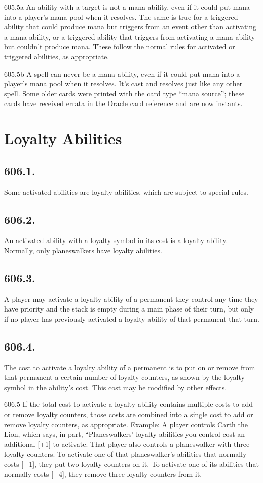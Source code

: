 605.5a An ability with a target is not a mana ability, even if it could put mana into a player’s mana pool when it resolves. The same is true for a triggered ability that could produce mana but triggers from an event other than activating a mana ability, or a triggered ability that triggers from activating a mana ability but couldn’t produce mana. These follow the normal rules for activated or triggered abilities, as appropriate.

605.5b A spell can never be a mana ability, even if it could put mana into a player’s mana pool when it resolves. It’s cast and resolves just like any other spell. Some older cards were printed with the card type “mana source”; these cards have received errata in the Oracle card reference and are now instants.

\section{Loyalty Abilities}
\subsection*{606.1.}
Some activated abilities are loyalty abilities, which are subject to special rules.

\subsection*{606.2.}
An activated ability with a loyalty symbol in its cost is a loyalty ability. Normally, only planeswalkers have loyalty abilities.

\subsection*{606.3.}
A player may activate a loyalty ability of a permanent they control any time they have priority and the stack is empty during a main phase of their turn, but only if no player has previously activated a loyalty ability of that permanent that turn.

\subsection*{606.4.}
The cost to activate a loyalty ability of a permanent is to put on or remove from that permanent a certain number of loyalty counters, as shown by the loyalty symbol in the ability’s cost. This cost may be modified by other effects.

606.5 If the total cost to activate a loyalty ability contains multiple costs to add or remove loyalty counters, those costs are combined into a single cost to add or remove loyalty counters, as appropriate.
Example: A player controls Carth the Lion, which says, in part, “Planeswalkers’ loyalty abilities you control cost an additional [+1] to activate. That player also controls a planeswalker with three loyalty counters. To activate one of that planeswalker’s abilities that normally costs [+1], they put two loyalty counters on it. To activate one of its abilities that normally costs [−4], they remove three loyalty counters from it.

